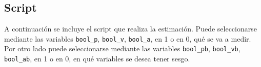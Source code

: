 \subsection{Script}

A continuación se incluye el script que realiza la estimación. Puede seleccionarse mediante las variables \texttt{bool\_p}, \texttt{bool\_v}, \texttt{bool\_a}, en 1 o en 0, qué se va a medir. Por otro lado puede seleccionarse mediante las variables \texttt{bool\_pb}, \texttt{bool\_vb}, \texttt{bool\_ab}, en 1 o en 0, en qué variables se desea tener sesgo.
	
	
	


